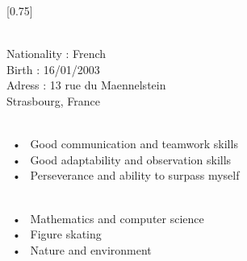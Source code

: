 \documentclass[lighthipster]{simplehipstercv}
\begin{document}
\setlength{\columnsep}{1.5cm}
[0.75]
\begin{paracol}{2}

\paracolbackgroundoptions



\footnotesize
{\setasidefontcolour
\flushright
\begin{center}
\end{center}

\bigskip


 \\[0.5em]
Nationality : French  \\
Birth : 16/01/2003 \\
Adress : 13 rue du Maennelstein \\ Strasbourg, France


\bigskip
\bigskip
\bigskip


 \\[0.5em]

~•~ Good communication and teamwork skills \\
~•~ Good adaptability and observation skills \\
~•~ Perseverance and ability to surpass myself

\bigskip
\bigskip
\bigskip


\\[0.5em]

~•~ Mathematics and computer science \\
~•~ Figure skating \\
~•~ Nature and environment \\

\bigskip

\vspace{4em}



\phantom{turn the page}

\phantom{turn the page}
}
\switchcolumn


\end{paracol}
\end{document}
